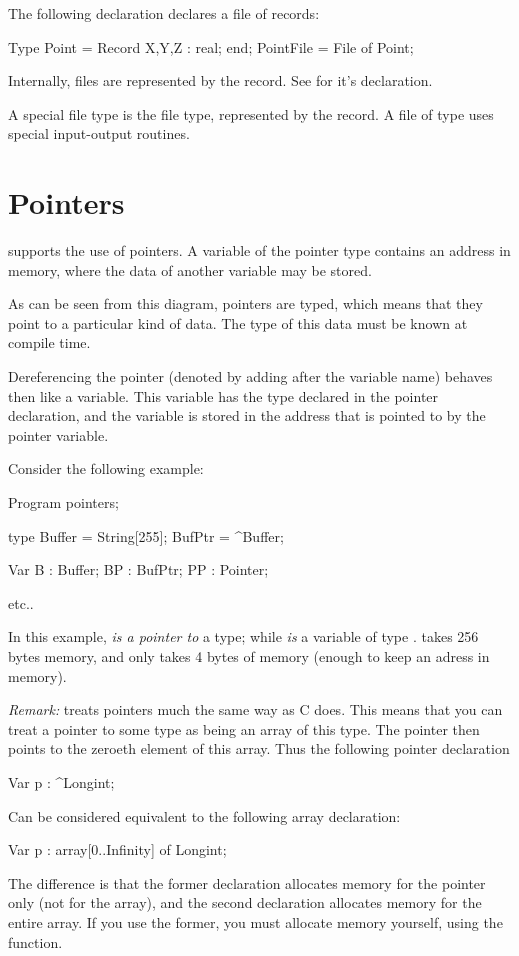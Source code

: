 \documentclass{report}
\begin{document}
The following declaration declares a file of records:
\begin{listing}
Type
   Point = Record
     X,Y,Z : real;
     end;
   PointFile = File of Point;
\end{listing}

Internally, files are represented by the  record.
See  for it's declaration.
 
A special file type is the  file type, represented by the
 record. A file of type  uses special input-output
routines.

\section{Pointers}
\fpc supports the use of pointers. A variable of the pointer type
contains an address in memory, where the data of another variable may be 
stored.



As can be seen from this diagram, pointers are typed, which means that 
they point to a particular kind of data. The type of this data must be 
known at compile time.

Dereferencing the pointer (denoted by adding \var{\^{}} after the variable
name) behaves then like a variable. This variable has the type declared in
the pointer declaration, and the variable is stored in the address that is 
pointed to by the pointer variable.

Consider the following example:
\begin{listing}
Program pointers;

type 
  Buffer = String[255];
  BufPtr = ^Buffer;

Var B  : Buffer;
    BP : BufPtr;
    PP : Pointer;

etc..
\end{listing}
In this example,  {\em is a pointer to} a  type; while 
{\em is} a variable of type .  takes 256 bytes memory,
and  only takes 4 bytes of memory (enough to keep an adress in
memory).

{\em Remark:} \fpc treats pointers much the same way as C does. This means
that you can treat a pointer to some type as being an array of this type.  
The pointer then points to the zeroeth element of this array. Thus the
following pointer declaration 
\begin{listing}
Var p : ^Longint;
\end{listing}
Can be considered equivalent to the following array declaration:
\begin{listing}
Var p : array[0..Infinity] of Longint;
\end{listing}
The difference is that the former declaration allocates memory for the
pointer only (not for the array), and the second declaration allocates
memory for the entire array. If you use the former, you must allocate memory
yourself, using the  function.
\end{document}
